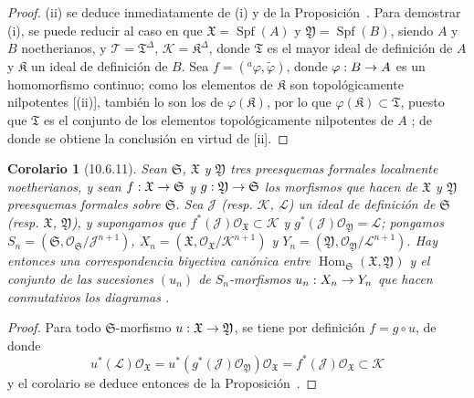 \documentclass[oneside]{amsart}
\theoremstyle{ega-env-style}
\theoremstyle{ega-thm-env-style}
\newtheorem*{corollary}{Corolario}
\theoremstyle{ega-defn-env-style}
\renewcommand{\to}{\mathchoice{\longrightarrow}{\rightarrow}{\rightarrow}{\rightarrow}}
\newcommand{\oldpage}[2][]{{\marginnote{\normalfont{\textbf{#1}~|~#2}}}\ignorespaces}
\let\EGAOriginalLabel\label
\renewcommand{\label}[1]{\phantomsection\EGAOriginalLabel{#1}}
\begin{document}
\begin{proof}
(ii) se deduce inmediatamente de (i) y de la Proposición~.
Para demostrar (i), se puede reducir al caso en que $\mathfrak{X}=\operatorname{Spf}(A)$ y $\mathfrak{Y}=\operatorname{Spf}(B)$, siendo $A$ y $B$ noetherianos, y $\mathscr{T}=\mathfrak{T}^\Delta$, $\mathscr{K}=\mathfrak{K}^\Delta$, donde $\mathfrak{T}$ es el mayor ideal de definición de $A$ y $\mathfrak{K}$ un ideal de definición de $B$.
Sea $f=({}^a\varphi,\widetilde{\varphi})$, donde $\varphi:B\to A$ es un homomorfismo continuo; como los elementos de $\mathfrak{K}$ son topológicamente nilpotentes [(ii)], también lo son los de $\varphi(\mathfrak{K})$, por lo que $\varphi(\mathfrak{K})\subset\mathfrak{T}$, puesto que $\mathfrak{T}$ es el conjunto de los elementos topológicamente nilpotentes de $A$ ; de donde se obtiene la conclusión en virtud de [ii].
\end{proof}

\begin{corollary}[10.6.11]
\label{I.10.6.11}
Sean $\mathfrak{S}$, $\mathfrak{X}$ y $\mathfrak{Y}$ tres preesquemas formales localmente noetherianos, y sean $f:\mathfrak{X}\to\mathfrak{S}$ y $g:\mathfrak{Y}\to\mathfrak{S}$ los morfismos que hacen de $\mathfrak{X}$ y $\mathfrak{Y}$ preesquemas formales sobre $\mathfrak{S}$.
Sea $\mathscr{J}$ \textup{(resp. $\mathscr{K}$, $\mathscr{L}$)} un ideal de definición de $\mathfrak{S}$ \textup{(resp. $\mathfrak{X}$, $\mathfrak{Y}$)}, y supongamos que $f^*(\mathscr{J})\mathscr{O}_{\mathfrak{X}}\subset\mathscr{K}$ y $g^*(\mathscr{J})\mathscr{O}_{\mathfrak{Y}}=\mathscr{L}$; pongamos $S_n=(\mathfrak{S},
\mathscr{O}_{\mathfrak{S}}/\mathscr{J}^{n+1})$, $X_n=(\mathfrak{X},
\mathscr{O}_{\mathfrak{X}}/\mathscr{K}^{n+1})$ y $Y_n=(\mathfrak{Y},
\mathscr{O}_{\mathfrak{Y}}/\mathscr{L}^{n+1})$.
Hay entonces una correspondencia biyectiva canónica
\oldpage[I]{193}
entre $\operatorname{Hom}_{\mathfrak{S}}(\mathfrak{X},\mathfrak{Y})$ y el conjunto de las sucesiones $(u_n)$ de $S_n$-morfismos $u_n:X_n\to Y_n$ que hacen conmutativos los diagramas .
\end{corollary}

\begin{proof}
Para todo $\mathfrak{S}$-morfismo $u:\mathfrak{X}\to\mathfrak{Y}$, se tiene por definición $f=g\circ u$, de donde
\[
  u^*(\mathscr{L})\mathscr{O}_{\mathfrak{X}}
  =u^*(g^*(\mathscr{J})\mathscr{O}_{\mathfrak{Y}})
    \mathscr{O}_{\mathfrak{X}}
  =f^*(\mathscr{J})\mathscr{O}_{\mathfrak{X}}
  \subset\mathscr{K}
\]
y el corolario se deduce entonces de la Proposición~.
\end{proof}
\end{document}

